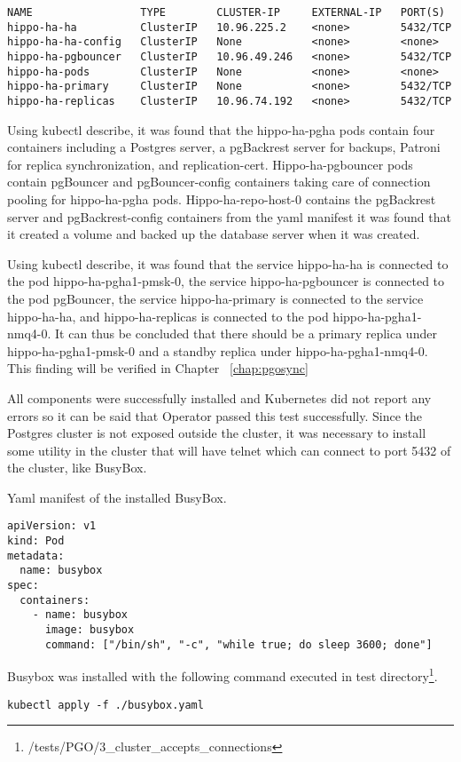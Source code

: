 \begin{verbatim}
NAME                 TYPE        CLUSTER-IP     EXTERNAL-IP   PORT(S)
hippo-ha-ha          ClusterIP   10.96.225.2    <none>        5432/TCP
hippo-ha-ha-config   ClusterIP   None           <none>        <none>
hippo-ha-pgbouncer   ClusterIP   10.96.49.246   <none>        5432/TCP
hippo-ha-pods        ClusterIP   None           <none>        <none>
hippo-ha-primary     ClusterIP   None           <none>        5432/TCP
hippo-ha-replicas    ClusterIP   10.96.74.192   <none>        5432/TCP
\end{verbatim}

Using kubectl describe, it was found that the hippo-ha-pgha pods contain four containers including a Postgres server, a pgBackrest server for backups, Patroni for replica synchronization, and replication-cert. Hippo-ha-pgbouncer pods contain pgBouncer and pgBouncer-config containers taking care of connection pooling for hippo-ha-pgha pods. Hippo-ha-repo-host-0 contains the pgBackrest server and pgBackrest-config containers from the yaml manifest it was found that it created a volume and backed up the database server when it was created.

Using kubectl describe, it was found that the service hippo-ha-ha is connected to the pod hippo-ha-pgha1-pmsk-0, the service hippo-ha-pgbouncer is connected to the pod pgBouncer, the service hippo-ha-primary is connected to the service hippo-ha-ha, and hippo-ha-replicas is connected to the pod hippo-ha-pgha1-nmq4-0. It can thus be concluded that there should be a primary replica under hippo-ha-pgha1-pmsk-0 and a standby replica under hippo-ha-pgha1-nmq4-0. This finding will be verified in Chapter ~\ref{chap:pgosync}

All components were successfully installed and Kubernetes did not report any errors so it can be said that Operator passed this test successfully.
Since the Postgres cluster is not exposed outside the cluster, it was necessary to install some utility in the cluster that will have telnet which can connect to port 5432 of the cluster, like BusyBox.

Yaml manifest of the installed BusyBox.
\begin{verbatim}
apiVersion: v1
kind: Pod
metadata:
  name: busybox
spec:
  containers:
    - name: busybox
      image: busybox
      command: ["/bin/sh", "-c", "while true; do sleep 3600; done"]
\end{verbatim}

Busybox was installed with the following command executed in test directory\footnote{/tests/PGO/3\_cluster\_accepts\_connections}.
\begin{verbatim}
kubectl apply -f ./busybox.yaml
\end{verbatim}

